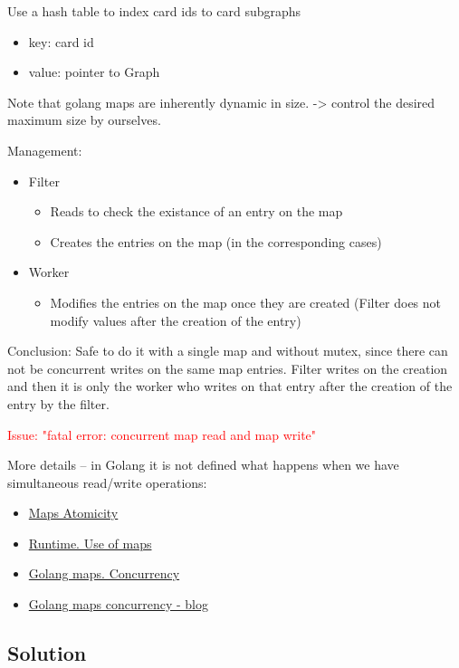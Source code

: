 \documentclass{article}
\begin{document}
Use a hash table to index card ids to card subgraphs
\begin{itemize}
  \item key: card id
  \item value: pointer to Graph
\end{itemize}

Note that golang maps are inherently dynamic in size. -> control the desired maximum size by ourselves. 

Management:
\begin{itemize}
  \item Filter
  \begin{itemize}
    \item Reads to check the existance of an entry on the map
    \item Creates the entries on the map (in the corresponding cases)
  \end{itemize}
  \item Worker
  \begin{itemize}
    \item Modifies the entries on the map once they are created
    (Filter does not modify values after the creation of the entry)
  \end{itemize}
\end{itemize}

Conclusion: Safe to do it with a single map and without mutex, since
there can not be concurrent writes on the same map entries. Filter writes
on the creation and then it is only the worker who writes on that entry after
the creation of the entry by the filter.

\textcolor{red}{Issue: "fatal error: concurrent map read and map write"}

More details -- in Golang it is not defined what happens when we have simultaneous read/write operations:

\begin{itemize}
  \item \href{https://go.dev/doc/faq#atomic_maps}{Maps Atomicity}
  \item \href{https://go.dev/doc/go1.6}{Runtime. Use of maps}
  \item \href{https://go.dev/blog/maps}{Golang maps. Concurrency}
  \item \href{https://groups.google.com/g/golang-nuts/c/_XHqFejikBg?pli=1}{Golang maps concurrency - blog}
\end{itemize}

\subsection{Solution}
\end{document}
